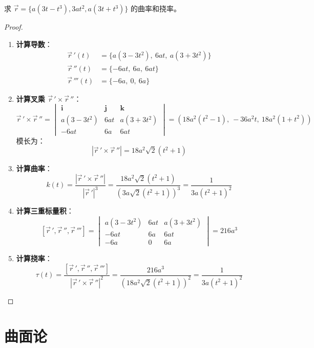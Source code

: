 \documentclass[lang=cn,10pt,thmcnt=section]{elegantbook}
\begin{document}
\begin{example}
	求 $\vec{r} = \{a(3t - t^3), 3at^2, a(3t + t^3)\}$ 的曲率和挠率。
\end{example}
\begin{proof}
	\begin{enumerate}
		\item \textbf{计算导数}：
		\begin{align*}
			\vec{r}\,'(t) &= \{a(3 - 3t^2),\ 6at,\ a(3 + 3t^2)\} \\
			\vec{r}\,''(t) &= \{-6at,\ 6a,\ 6at\} \\
			\vec{r}\,'''(t) &= \{-6a,\ 0,\ 6a\}
		\end{align*}
		
		\item \textbf{计算叉乘 $\vec{r}\,' \times \vec{r}\,''$}：
		\[
			\vec{r}\,' \times \vec{r}\,'' = \begin{vmatrix}
				\mathbf{i} & \mathbf{j} & \mathbf{k} \\
				a(3-3t^2) & 6at & a(3+3t^2) \\
				-6at & 6a & 6at
			\end{vmatrix} = \left(18a^2(t^2-1),\ -36a^2t,\ 18a^2(1+t^2)\right)
		\]
		模长为：
		\[
			|\vec{r}\,' \times \vec{r}\,''| = 18a^2\sqrt{2}(t^2 + 1)
		\]
		
		\item \textbf{计算曲率}：
		\[
			k(t) = \frac{|\vec{r}\,' \times \vec{r}\,''|}{|\vec{r}\,'|^3} = \frac{18a^2\sqrt{2}(t^2+1)}{\left(3a\sqrt{2}(t^2+1)\right)^3} = \frac{1}{3a(t^2+1)^2}
		\]
		
		\item \textbf{计算三重标量积}：
		\[
			[\vec{r}\,', \vec{r}\,'', \vec{r}\,'''] = \begin{vmatrix}
				a(3-3t^2) & 6at & a(3+3t^2) \\
				-6at & 6a & 6at \\
				-6a & 0 & 6a
			\end{vmatrix} = 216a^3
		\]
		
		\item \textbf{计算挠率}：
		\[
			\tau(t) = \frac{[\vec{r}\,', \vec{r}\,'', \vec{r}\,''']}{|\vec{r}\,' \times \vec{r}\,''|^2} = \frac{216a^3}{\left(18a^2\sqrt{2}(t^2+1)\right)^2} = \frac{1}{3a(t^2+1)^2}
		\]
	\end{enumerate}
		

\end{proof}

\chapter{曲面论}
\end{document}
